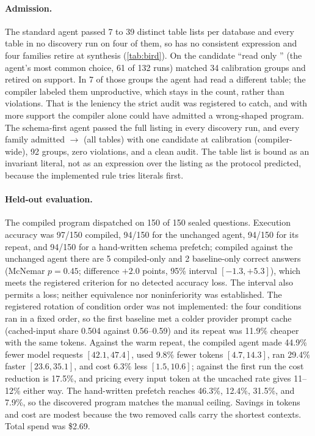 \paragraph{Admission.} The standard agent passed 7 to 39 distinct table lists
per database and every table in no discovery run on four of them, so
 has no consistent expression and four families
retire at synthesis (\cref{tab:bird}). On  the candidate
``read only '' (the agent's most common choice, 61 of 132 runs)
matched 34 calibration groups and retired on support. In 7 of those groups the
agent had read a different table; the compiler labeled them unproductive, which
stays in the count, rather than violations. That is the leniency the strict
audit was registered to catch, and with more support the compiler alone could
have admitted a wrong-shaped program. The schema-first agent passed the full
listing in every discovery run, and every family admitted
 $\to$ (all tables) with one candidate at
calibration (compiler-wide), 92 groups, zero violations, and a clean audit. The
table list is bound as an invariant literal, not as an expression over the
listing as the protocol predicted, because the implemented rule tries literals
first.

\paragraph{Held-out evaluation.} The compiled program dispatched on 150 of 150
sealed questions. Execution accuracy was 97/150 compiled, 94/150 for the
unchanged agent, 94/150 for its repeat, and 94/150 for a hand-written schema
prefetch; compiled against the unchanged agent there are 5 compiled-only and 2
baseline-only correct answers (McNemar $p=0.45$; difference $+2.0$ points,
95\% interval $[-1.3,+5.3]$), which meets the registered criterion for no
detected accuracy loss. The interval also permits a loss; neither equivalence
nor noninferiority was established. The registered rotation
of condition order was not implemented: the four conditions ran in a fixed
order, so the first baseline met a colder provider prompt cache (cached-input
share 0.504 against 0.56--0.59) and its repeat was 11.9\% cheaper with the same
tokens. Against the warm repeat, the compiled agent made 44.9\% fewer model
requests $[42.1,47.4]$, used 9.8\% fewer tokens $[4.7,14.3]$, ran 29.4\% faster
$[23.6,35.1]$, and cost 6.3\% less $[1.5,10.6]$; against the first run the cost
reduction is 17.5\%, and pricing every input token at the uncached rate gives
11--12\% either way. The hand-written prefetch reaches 46.3\%, 12.4\%, 31.5\%,
and 7.9\%, so the discovered program matches the manual ceiling. Savings in
tokens and cost are modest because the two removed calls carry the shortest
contexts. Total spend was \$2.69.

